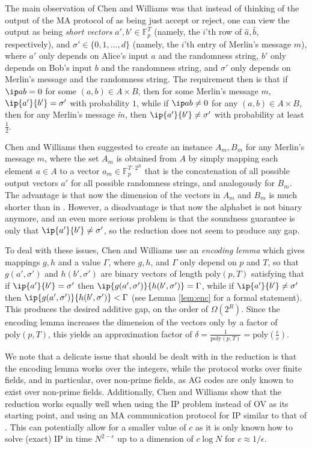 \documentclass[11pt]{article}
\theoremstyle{plain}
\theoremstyle{remark}
\newcommand{\F}{\mathbb{F}}
\newcommand{\poly}{\mathrm{poly}}
\begin{document}
The main observation of Chen and Williams was that instead of thinking of the output of the MA protocol of  \cite{Rub18} as being just accept or reject, one can view the output as being \emph{short vectors} $a',b' \in \F_p^T$ (namely, the $i$'th row of $\hat a, \hat b$, respectively), and $\sigma' \in \{0,1,\ldots, d\}$ (namely, the $i$'th entry of Merlin's message $m$), where $a'$ only depends on Alice's input $a$ and the randomness string, $b'$ only depends on Bob's input $b$ and the randomness string, and $\sigma'$ only depends on Merlin's message and the randomness string. The requirement then is that if $\ip a b =0$ for some $(a,b) \in A \times B$,
then for some Merlin's message $m$,
$\ip {a'} {b'} = \sigma'$ with probability $1$, while if $\ip a b \neq 0$ for any $(a,b) \in A \times B$,
then for any Merlin's message $\tilde m$,
then $\ip {a'} {b'} \neq \sigma'$ with probability at least $\frac 1 2$. 


Chen and Williams then suggested to create an instance $A_m, B_m$  for any Merlin's message $m$, where the set $A_m$  is obtained from $A$ by simply mapping each element $a \in A$ to a vector $a_m \in \F_p^{T \cdot 2^R}$ that is the concatenation of all possible output vectors $a'$ for all possible randomness strings, and analogously for $B_m$. The advantage is that now 
the dimension of the vectors in $A_m$ and $B_m$ is much shorter than in  
\cite{Rub18}. However,  a disadvantage is that now the alphabet is not binary anymore, and an even more serious problem is that the soundness guarantee is only that $\ip {a'} {b'} \neq \sigma'$, so the reduction does not seem to produce any gap.


To deal with these issues, Chen and Williams use an \emph{encoding lemma} which gives mappings $g,h$ and a value $\Gamma$, where $g,h$, and $\Gamma$ only depend on $p$ and $T$, so that $g(a',\sigma')$ and $h(b',\sigma')$ are binary vectors of length $\poly(p, T)$ satisfying that if $\ip {a'} {b'} = \sigma'$ then $\ip {g(a',\sigma')} {h(b',\sigma')} =\Gamma$, while if $\ip {a'} {b'} \neq \sigma'$ then $\ip {g(a',\sigma')} {h(b',\sigma')} < \Gamma$ (see Lemma \ref{lem:enc} for a formal statement). This produces the desired additive gap, on the order of $\Omega(2^R)$. Since the encoding lemma increases the dimension of the vectors only by a factor of $\poly(p,T)$, this yields an approximation factor of $\delta =\frac{1} {\poly(p,T)}=  \poly(\frac \epsilon c)$.

We note that a delicate issue that should be dealt with in the reduction is that the encoding lemma works over the integers, while the protocol works over finite fields, and in particular, over non-prime fields, as AG codes are only known to exist over non-prime fields. Additionally, Chen and Williams show that the reduction works equally well when using the IP problem instead of OV as its starting point, and using an MA communication protocol for IP similar to that of \cite{AW09}. This can potentially allow for a smaller value of $c$ as it is only known how to solve (exact) IP in time 
 $N^{2-\epsilon}$ up to a dimension of $c \log N$ for $c \approx 1/\epsilon$. 
\end{document}
